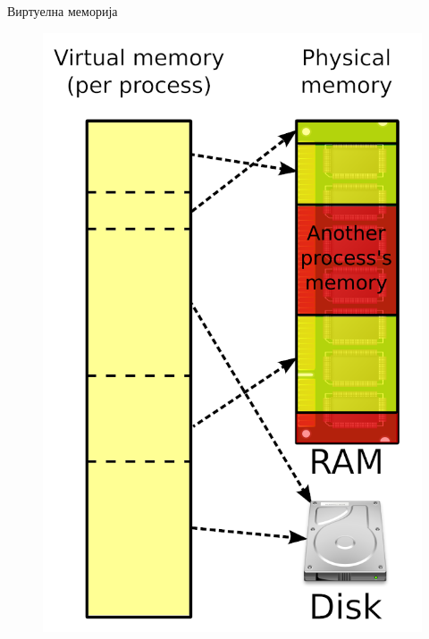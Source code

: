 \documentclass[xcolor=table]{beamer}
\begin{document}
\begin{frame}[allowframebreaks]{Виртуелна меморија}
        \begin{figure}
            \centering
            \includegraphics[width=\textwidth,height=0.8\textheight,keepaspectratio]{images/virtmem.png}
            \label{fig:virtmem}
        \end{figure}
    \end{frame}
    
\end{document}
